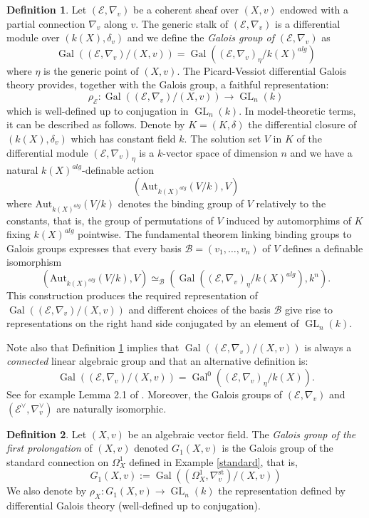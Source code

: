 \documentclass[12pt]{amsart}
\DeclareMathOperator{\Gal}{Gal}
\DeclareMathOperator{\GL}{GL}
\theoremstyle{definition}
\newtheorem{definition}{Definition}[subsection]
\theoremstyle{plain}
\theoremstyle{exampstyle}
\theoremstyle{exampstyle}\newtheorem{thmxbis}{Theorem}
\numberwithin{equation}{section}
\theoremstyle{remark}
\begin{document}
\begin{definition} \label{definition-Galoisgroup}
Let $(\mathcal E, \nabla_v)$ be a coherent sheaf over $(X,v)$ endowed with a partial connection $\nabla_v$ along $v$. The generic stalk of  $(\mathcal E, \nabla_v)$ is a differential module over $(k(X),\delta_v)$ and we define the {\em Galois group of $(\mathcal E, \nabla_v)$} as 
$$\Gal((\mathcal E,\nabla_v)/(X,v)) = \Gal((\mathcal E,\nabla_v)_\eta/k(X)^{alg})$$
where $\eta$ is the generic point of $(X,v)$. The Picard-Vessiot differential Galois theory provides, together with the Galois group, a faithful representation: 
$$\rho_\mathcal E: \Gal((\mathcal E,\nabla_v)/(X,v)) \rightarrow \GL_n(k)$$ 
which is well-defined up to conjugation in $\GL_n(k)$. In model-theoretic terms, it can be described as follows. Denote by $K = (K,\delta)$ the differential closure of $(k(X),\delta_v)$ which has constant field $k$. The solution set $V$ in $K$ of the differential module $(\mathcal E,\nabla_v)_\eta$ is a $k$-vector space of dimension $n$ and we have a natural $k(X)^{alg}$-definable action  
$$(\mathrm{Aut}_{k(X)^{alg}}(V/k), V)$$ 
where $\mathrm{Aut}_{k(X)^{alg}}(V/k)$ denotes the binding group of $V$ relatively to the constants, that is, the group of permutations of $V$ induced by automorphims of $K$ fixing $k(X)^{alg}$ pointwise. The fundamental theorem linking binding groups to Galois groups \citep[Appendix B]{Hrushovski-Galois} expresses that every basis $\mathcal B = (v_1,\ldots, v_n)$ of $V$ defines a definable isomorphism 
\begin{equation} \label{equation-Galois-binding}  
(\mathrm{Aut}_{k(X)^{alg}}(V/k),V) \simeq_\mathcal B (\Gal((\mathcal E,\nabla_v)_\eta/k(X)^{alg}),k^n).
\end{equation} 
This construction produces the required representation of $\Gal((\mathcal E,\nabla_v)/(X,v))$ and different choices of the basis $\mathcal B$ give rise to representations on the right hand side conjugated by an element of $\GL_n(k)$.
\end{definition} 
Note also that Definition \ref{definition-Galoisgroup} implies that $\Gal((\mathcal E,\nabla_v)/(X,v))$ is always a {\em connected} linear algebraic group and that an alternative definition is: 
$$\Gal((\mathcal E,\nabla_v)/(X,v)) = \Gal^0((\mathcal E,\nabla_v)_\eta/k(X)).$$
See for example Lemma 2.1 of \cite{Jaoui-Moosa}.
Moreover, the Galois groups of $(\mathcal E,\nabla_v)$ and $(\mathcal E^\vee, \nabla_v^\vee)$ are naturally isomorphic. 

\begin{definition} 
Let $(X,v)$ be an algebraic vector field. The {\em Galois group of the first prolongation} of $(X,v)$ denoted $G_1(X,v)$ is the Galois group of the standard connection on $\Omega^1_X$ defined in Example \ref{standard}, that is,
$$G_1(X,v) := \Gal((\Omega^1_X, \nabla^{\mathrm{st}}_v)/(X,v)) $$
We also denote by $\rho_X: G_1(X,v) \rightarrow \GL_n(k)$
the representation defined by differential Galois theory (well-defined up to conjugation).
\end{definition}
\end{document}
